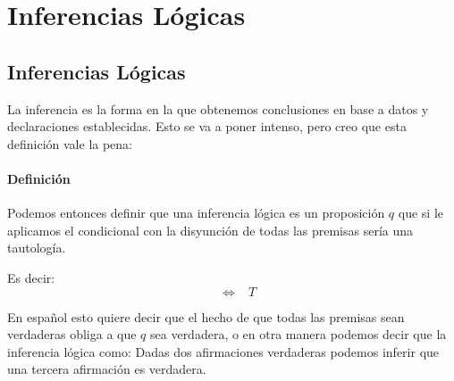 \documentclass[12pt, fleqn]{report}                             %
\DeclareMathOperator \Space     {\quad}                         %
\DeclareMathOperator \MiniSpace {\;}                            %
\theoremstyle{break}                                            %
\newcommand \lEqual  {\MiniSpace \Leftrightarrow \MiniSpace}    %
\begin{document}
    \clearpage
    \chapter{Inferencias Lógicas}
        \clearpage

        
        \section{Inferencias Lógicas}

            La inferencia es la forma en la que obtenemos conclusiones en base a datos y declaraciones establecidas.
            Esto se va a poner intenso, pero creo que esta definición vale la pena:

            \subsubsection{Definición}

                Podemos entonces definir que una inferencia lógica es un proposición $q$ que si le aplicamos
                el condicional con la disyunción de todas las premisas sería una tautología.

                Es decir:
                \begin{equation*}
                    [p_1 \land p_2 \land p_3 \dots \to q] \lEqual T
                \end{equation*}

                En español esto quiere decir que el hecho de que todas las premisas sean verdaderas obliga a
                que $q$ sea verdadera, o en otra manera podemos decir que la inferencia lógica como: 
                Dadas dos afirmaciones verdaderas podemos inferir que una tercera afirmación es verdadera.


\end{document}
